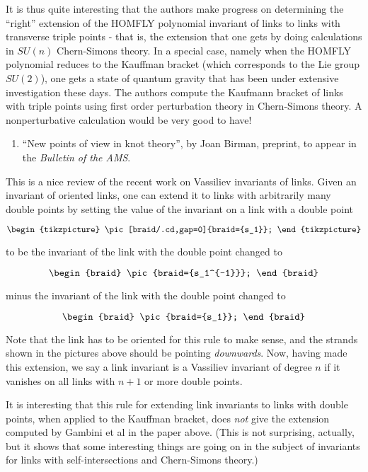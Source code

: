 \documentclass{article}
\def\tightlist{}
\begin{document}
It is thus quite interesting that the authors make progress on
determining the ``right'' extension of the HOMFLY polynomial invariant
of links to links with transverse triple points - that is, the extension
that one gets by doing calculations in \(SU(n)\) Chern-Simons theory. In
a special case, namely when the HOMFLY polynomial reduces to the
Kauffman bracket (which corresponds to the Lie group \(SU(2)\)), one
gets a state of quantum gravity that has been under extensive
investigation these days. The authors compute the Kaufmann bracket of
links with triple points using first order perturbation theory in
Chern-Simons theory. A nonperturbative calculation would be very good to
have!

\begin{enumerate}
\def\labelenumi{\arabic{enumi})}
\setcounter{enumi}{1}
\tightlist
\item
  ``New points of view in knot theory'', by Joan Birman, preprint, to
  appear in the \emph{Bulletin of the AMS}.
\end{enumerate}

This is a nice review of the recent work on Vassiliev invariants of
links. Given an invariant of oriented links, one can extend it to links
with arbitrarily many double points by setting the value of the
invariant on a link with a double point

\[
  \begin{tikzpicture}
    \pic[braid/.cd,gap=0]{braid={s_1}};
  \end{tikzpicture}
\]

to be the invariant of the link with the double point changed to

\[
  \begin{braid}
    \pic{braid={s_1^{-1}}};
  \end{braid}
\]

minus the invariant of the link with the double point changed to

\[
  \begin{braid}
    \pic{braid={s_1}};
  \end{braid}
\]

Note that the link has to be oriented for this rule to make sense, and
the strands shown in the pictures above should be pointing
\emph{downwards}. Now, having made this extension, we say a link
invariant is a Vassiliev invariant of degree \(n\) if it vanishes on all
links with \(n+1\) or more double points.

It is interesting that this rule for extending link invariants to links
with double points, when applied to the Kauffman bracket, does
\emph{not} give the extension computed by Gambini et al in the paper
above. (This is not surprising, actually, but it shows that some
interesting things are going on in the subject of invariants for links
with self-intersections and Chern-Simons theory.)
\end{document}
